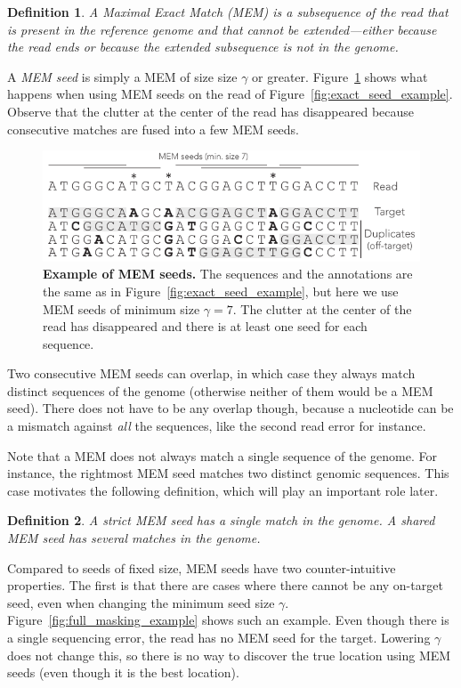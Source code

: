 \documentclass{article}
\newtheorem{definition}{Definition}
\begin{document}
\begin{definition}
A Maximal Exact Match (MEM) is a subsequence of the read that is present
in the reference genome and that cannot be extended---either because the
read ends or because the extended subsequence is not in the genome.
\end{definition}

A \emph{MEM seed} is simply a MEM of size size $\gamma$ or greater.
Figure~\ref{fig:MEM_example} shows what happens when using MEM seeds on the
read of Figure~\ref{fig:exact_seed_example}. Observe that the clutter at the
center of the read has disappeared because consecutive matches are fused
into a few MEM seeds.

\begin{figure}[h]
\centering
\includegraphics[scale=1]{MEM_example.pdf}
\caption{\textbf{Example of MEM seeds.}
The sequences and the annotations are the same as in
Figure~\ref{fig:exact_seed_example}, but here we use MEM seeds of minimum
size $\gamma=7$. The clutter at the center of the read has disappeared and
there is at least one seed for each sequence.}
\label{fig:MEM_example}
\end{figure}

Two consecutive MEM seeds can overlap, in which case they always match
distinct sequences of the genome (otherwise neither of them would be a MEM
seed). There does not have to be any overlap though, because a nucleotide
can be a mismatch against \emph{all} the sequences, like the second read
error for instance.

Note that a MEM does not always match a single sequence of the genome. For
instance, the rightmost MEM seed matches two distinct genomic sequences.
This case motivates the following definition, which will play an important
role later.

\begin{definition}
A \emph{strict} MEM seed has a single match in the genome.
A \emph{shared} MEM seed has several matches in the genome.
\end{definition}

Compared to seeds of fixed size, MEM seeds have two counter-intuitive
properties. The first is that there are cases where there cannot be any
on-target seed, even when changing the minimum seed size $\gamma$.
Figure~\ref{fig:full_masking_example} shows such an example. Even though
there is a single sequencing error, the read has no MEM seed for the
target. Lowering $\gamma$ does not change this, so there is no way to
discover the true location using MEM seeds (even though it is the best
location).
\end{document}
